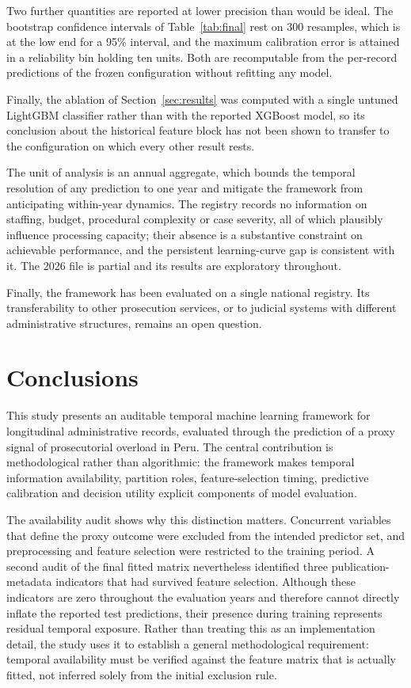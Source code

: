 \documentclass[sn-vancouver,Numbered]{sn-jnl}
\begin{document}
Two further quantities are reported at lower precision than would be ideal. The bootstrap confidence intervals of Table~\ref{tab:final} rest on 300 resamples, which is at the low end for a 95\% interval, and the maximum calibration error is attained in a reliability bin holding ten units. Both are recomputable from the per-record predictions of the frozen configuration without refitting any model.

Finally, the ablation of Section~\ref{sec:results} was computed with a single untuned LightGBM classifier rather than with the reported XGBoost model, so its conclusion about the historical feature block has not been shown to transfer to the configuration on which every other result rests.

The unit of analysis is an annual aggregate, which bounds the temporal resolution of any prediction to one year and mitigate the framework from anticipating within-year dynamics. The registry records no information on staffing, budget, procedural complexity or case severity, all of which plausibly influence processing capacity; their absence is a substantive constraint on achievable performance, and the persistent learning-curve gap is consistent with it. The 2026 file is partial and its results are exploratory throughout.

Finally, the framework has been evaluated on a single national registry. Its transferability to other prosecution services, or to judicial systems with different administrative structures, remains an open question.

\section{Conclusions}\label{sec:conclusions}

This study presents an auditable temporal machine learning framework for longitudinal administrative records, evaluated through the prediction of a proxy signal of prosecutorial overload in Peru. The central contribution is methodological rather than algorithmic: the framework makes temporal information availability, partition roles, feature-selection timing, predictive calibration and decision utility explicit components of model evaluation.

The availability audit shows why this distinction matters. Concurrent variables that define the proxy outcome were excluded from the intended predictor set, and preprocessing and feature selection were restricted to the training period. A second audit of the final fitted matrix nevertheless identified three publication-metadata indicators that had survived feature selection. Although these indicators are zero throughout the evaluation years and therefore cannot directly inflate the reported test predictions, their presence during training represents residual temporal exposure. Rather than treating this as an implementation detail, the study uses it to establish a general methodological requirement: temporal availability must be verified against the feature matrix that is actually fitted, not inferred solely from the initial exclusion rule.
\end{document}
